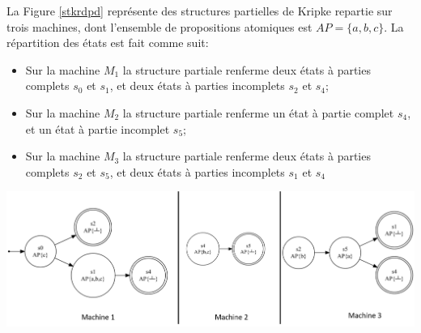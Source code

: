 La Figure \ref{stkrdpd} représente des structures partielles de Kripke repartie sur trois machines, dont l'ensemble de propositions atomiques est ${\displaystyle AP=\{a,b,c\}}$. La répartition des états est fait comme suit:  
\begin{itemize}
 \item Sur la machine $M_1$ la structure partiale renferme deux  états à parties complets $s_0$ et $s_1$, et deux états à parties incomplets $s_2$ et $s_4$;
 \item Sur la machine $M_2$ la structure partiale renferme un état à partie complet $s_4$, et un état à partie incomplet $s_5$;
 \item Sur la machine $M_3$ la structure partiale renferme deux  états à parties complets $s_2$ et $s_5$, et deux états à parties incomplets $s_1$ et $s_4$
 \end{itemize}

\begin{center}
	\includegraphics[scale=0.5]{img/stkd.png}
	 \label{stkrdpd}
 \end{center}